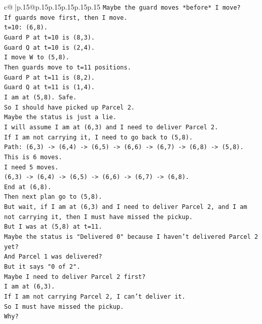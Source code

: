 \documentclass{article}
\begin{document}
{\begin{supertabular}{c@{$\;$}|p{.15\linewidth}@{}p{.15\linewidth}p{.15\linewidth}p{.15\linewidth}p{.15\linewidth}p{.15\linewidth}}
{{{\texttt{Maybe the guard moves *before* I move?} \\
\texttt{If guards move first, then I move.} \\
\texttt{t=10: (6,8).} \\
\texttt{Guard P at t=10 is (8,3).} \\
\texttt{Guard Q at t=10 is (2,4).} \\
\texttt{I move W to (5,8).} \\
\texttt{Then guards move to t=11 positions.} \\
\texttt{Guard P at t=11 is (8,2).} \\
\texttt{Guard Q at t=11 is (1,4).} \\
\texttt{I am at (5,8). Safe.} \\
\texttt{So I should have picked up Parcel 2.} \\
\texttt{Maybe the status is just a lie.} \\
\texttt{I will assume I am at (6,3) and I need to deliver Parcel 2.} \\
\texttt{If I am not carrying it, I need to go back to (5,8).} \\
\texttt{Path: (6,3) {-}> (6,4) {-}> (6,5) {-}> (6,6) {-}> (6,7) {-}> (6,8) {-}> (5,8).} \\
\texttt{This is 6 moves.} \\
\texttt{I need 5 moves.} \\
\texttt{(6,3) {-}> (6,4) {-}> (6,5) {-}> (6,6) {-}> (6,7) {-}> (6,8).} \\
\texttt{End at (6,8).} \\
\texttt{Then next plan go to (5,8).} \\
\texttt{But wait, if I am at (6,3) and I need to deliver Parcel 2, and I am not carrying it, then I must have missed the pickup.} \\
\texttt{But I was at (5,8) at t=11.} \\
\texttt{Maybe the status is "Delivered 0" because I haven't delivered Parcel 2 yet?} \\
\texttt{And Parcel 1 was delivered?} \\
\texttt{But it says "0 of 2".} \\
\texttt{Maybe I need to deliver Parcel 2 first?} \\
\texttt{I am at (6,3).} \\
\texttt{If I am not carrying Parcel 2, I can't deliver it.} \\
\texttt{So I must have missed the pickup.} \\
\texttt{Why?} \\
}}}
\end{supertabular}}
\end{document}
